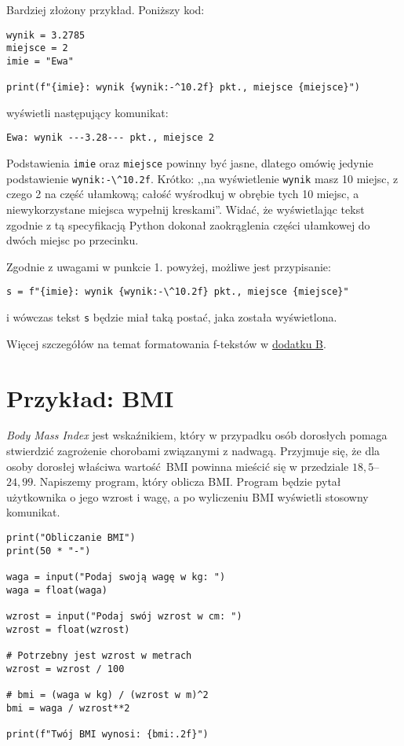 \documentclass[a4paper]{article}
\begin{document}
\begin{enumerate}[label=ad. {\arabic*}]
        Bardziej złożony przykład. Poniższy kod:

        \lstset{numbers=none}
        \begin{lstlisting}
wynik = 3.2785
miejsce = 2
imie = "Ewa"

print(f"{imie}: wynik {wynik:-^10.2f} pkt., miejsce {miejsce}")
\end{lstlisting}

        wyświetli następujący komunikat:

        \lstinline|Ewa: wynik ---3.28--- pkt., miejsce 2|

        Podstawienia \texttt{imie} oraz \texttt{miejsce} powinny być jasne, dlatego omówię jedynie podstawienie \lstinline{wynik:-\^10.2f}. Krótko: ,,na wyświetlenie \texttt{wynik} masz 10 miejsc, z czego 2 na część ułamkową; całość wyśrodkuj w obrębie tych 10 miejsc, a niewykorzystane miejsca wypełnij kreskami''. Widać, że wyświetlając tekst zgodnie z tą specyfikacją Python dokonał zaokrąglenia części ułamkowej do dwóch miejsc po przecinku.

        Zgodnie z uwagami w punkcie 1. powyżej, możliwe jest przypisanie:

        \lstinline|s = f"{imie}: wynik {wynik:-\^10.2f} pkt., miejsce {miejsce}"|

        i wówczas tekst \texttt{s} będzie miał taką postać, jaka została wyświetlona.

        Więcej szczegółów na temat formatowania f-tekstów w \hyperref[dodatek-B]{dodatku B}.

\end{enumerate}

\section{Przykład: BMI}

\emph{Body Mass Index} jest wskaźnikiem, który w przypadku osób dorosłych pomaga stwierdzić zagrożenie chorobami związanymi z nadwagą. Przyjmuje się, że dla osoby dorosłej właściwa wartość BMI powinna mieścić się w przedziale $18{,}5$--$24{,}99$. Napiszemy program, który oblicza BMI. Program będzie pytał użytkownika o jego wzrost i wagę, a po wyliczeniu BMI wyświetli stosowny komunikat.

\lstset{numbers=left}
\begin{lstlisting}
print("Obliczanie BMI")
print(50 * "-")

waga = input("Podaj swoją wagę w kg: ")
waga = float(waga)

wzrost = input("Podaj swój wzrost w cm: ")
wzrost = float(wzrost)

# Potrzebny jest wzrost w metrach
wzrost = wzrost / 100

# bmi = (waga w kg) / (wzrost w m)^2
bmi = waga / wzrost**2

print(f"Twój BMI wynosi: {bmi:.2f}")
\end{lstlisting}
\label{int-oraz-float}
\end{document}

